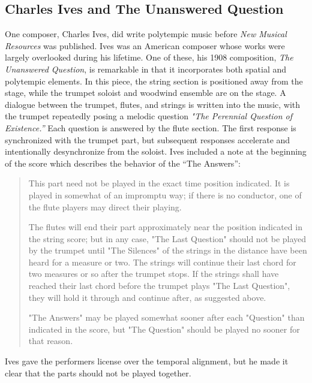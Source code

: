 \subsection{Charles Ives and The Unanswered Question}
\label{sec:charles-ives}
One composer, Charles Ives, did write polytempic music before \textit{New Musical
  Resources} was published. Ives was an American composer
whose works were largely overlooked during his lifetime. One of these,
his 1908 composition, \textit{The Unanswered Question}, is remarkable in
that it incorporates both spatial and polytempic elements. In this
piece, the string section is positioned away from the stage, while the
trumpet soloist and woodwind ensemble are on the stage. A dialogue
between the trumpet, flutes, and strings is written into the music,
with the trumpet repeatedly posing a melodic question \textit{"The
  Perennial Question of Existence.''} Each question is answered by the
flute section. The first response is synchronized with the trumpet
part, but subsequent responses accelerate and intentionally
desynchronize from the soloist. Ives included a note at the beginning
of the score which describes the behavior of the ``The Answers'':
\begin{quotation}
This part need not be played in the exact time position indicated. It
is played in somewhat of an impromptu way; if there is no conductor,
one of the flute players may direct their playing.

The flutes will end their part approximately near the position
indicated in the string score; but in any case, "The Last Question"
should not be played by the trumpet until "The Silences" of the
strings in the distance have been heard for a measure or two. The
strings will continue their last chord for two measures or so after
the trumpet stops. If the strings shall have reached their last chord
before the trumpet plays "The Last Question", they will hold it
through and continue after, as suggested above.

"The Answers" may be played somewhat sooner after each "Question" than
indicated in the score, but "The Question" should be played no sooner
for that reason.
\end{quotation}
Ives gave the performers license over the temporal alignment, but he
made it clear that the parts should not be played together. 


